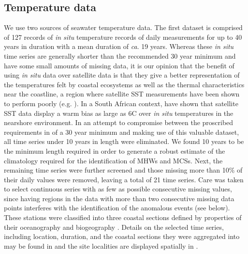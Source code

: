 \documentclass[a4paper,10pt,review]{elsarticle}
\begin{document}
\subsection{Temperature data}
We use two sources of seawater temperature data. The first dataset is comprised of 127 records of \emph{in situ} temperature records of daily measurements for up to 40 years in duration with a mean duration of \emph{ca}. 19 years. Whereas these \emph{in situ} time series are generally shorter than the recommended 30 year minimum \citep{Hobday2016} and have some small amounts of missing data, it is our opinion that the benefit of using \emph{in situ} data over satellite data is that they give a better representation of the temperatures felt by coastal ecosystems as well as the thermal characteristics near the coastline, a region where satellite SST measurements have been shown to perform poorly (e.g. \cite{Smale2009, Castillo2010}). In a South African context, \citet{Smit2013} have shown that satellite SST data display a warm bias as large as 6\degree C over \emph{in situ} temperatures in the nearshore environment. In an attempt to compromise between the proscribed requirements in \citet{Hobday2016} of a 30 year minimum and making use of this valuable dataset, all time series under 10 years in length were eliminated. We found 10 years to be the minimum length required in order to generate a robust estimate of the climatology required for the identification of MHWs and MCSs. Next, the remaining time series were further screened and those missing more than 10\% of their daily values were removed, leaving a total of 21 time series. Care was taken to select continuous series with as few as possible consecutive missing values, since having regions in the data with more than two consecutive missing data points interferes with the identification of the anomalous events (see below). These stations were classified into three coastal sections defined by properties of their oceanography and biogeography \cite{Smit2013}. Details on the selected time series, including location, duration, and the coastal sections they were aggregated into may be found in  and the site localities are displayed spatially in .
\end{document}
